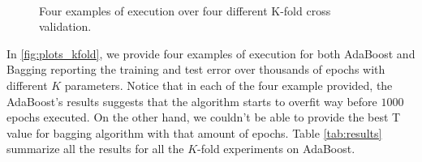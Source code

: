 \begin{figure}
	\centering
	\\
	\caption{\label{fig:plots_kfold}Four examples of execution over four different K-fold cross validation.}
\end{figure}
In \autoref{fig:plots_kfold}, we provide four examples of execution for both AdaBoost and Bagging reporting the training and test error over thousands of epochs with different $K$ parameters. Notice that in each of the four example provided, the AdaBoost's results suggests that the algorithm starts to overfit way before $1000$ epochs executed. On the other hand, we couldn't be able to provide the best T value for bagging algorithm with that amount of epochs.
Table \autoref{tab:results} summarize all the results for all the $K$-fold experiments on AdaBoost.

